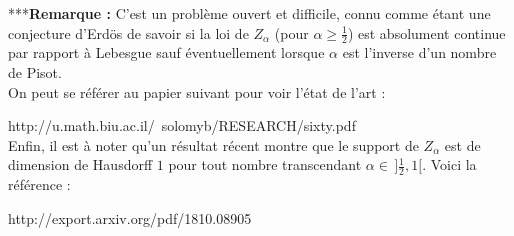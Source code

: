 ***\textbf{Remarque :} C'est un problème ouvert et difficile, connu comme étant une conjecture d'Erdös de savoir si la loi de $Z_{\alpha}$ (pour $\alpha\geq \frac{1}{2}$) est absolument continue par rapport à Lebesgue sauf éventuellement lorsque $\alpha$ est l'inverse d'un nombre de Pisot.\\

On peut se référer au papier suivant pour voir l'état de l'art :

http://u.math.biu.ac.il/~solomyb/RESEARCH/sixty.pdf\\

Enfin, il est à noter qu'un résultat récent montre que le support de $Z_{\alpha}$ est de dimension de Hausdorff $1$ pour tout nombre transcendant $\alpha\in\,]\frac{1}{2},1[.$ Voici la référence :

http://export.arxiv.org/pdf/1810.08905
